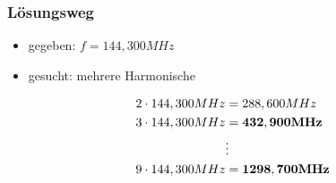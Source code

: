\begin{frame}
\frametitle{Lösungsweg}
\begin{itemize}
  \item gegeben: $f = 144,300MHz$
  \item gesucht: mehrere Harmonische
  \end{itemize}
    \pause
    $$\begin{align}\notag 2 \cdot 144,300MHz &= 288,600MHz\\ \notag 3 \cdot 144,300MHz &= \bold{432,900MHz}\\ \notag &\vdots\\ \notag 9 \cdot 144,300MHz &= \bold{1298,700MHz}\end{align}$$



\end{frame}%

